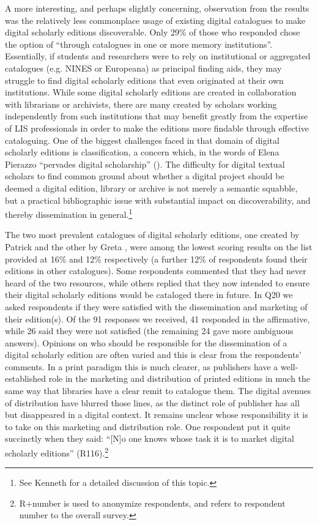 \begin{paper}
A more interesting, and perhaps slightly concerning, observation from
the results was the relatively less commonplace usage of existing
digital catalogues to make digital scholarly editions discoverable. Only
29\% of those who responded chose the option of ``through catalogues in
one or more memory institutions''. Essentially, if students and
researchers were to rely on institutional or aggregated catalogues (e.g.
NINES or Europeana) as principal finding aids, they may struggle to find
digital scholarly editions that even originated at their own
institutions. While some digital scholarly editions are created in
collaboration with librarians or archivists, there are many created by
scholars working independently from such institutions that may benefit
greatly from the expertise of LIS professionals in order to make the
editions more findable through effective cataloguing. One of the biggest
challenges faced in that domain of digital scholarly editions is
classification, a concern which, in the words of Elena Pierazzo
``pervades digital scholarship'' (\citeyear[6]{pierazzo_digital_2015}). The difficulty for digital
textual scholars to find common ground about whether a digital project should
be deemed a digital edition, library or archive is not merely a semantic
squabble, but a practical bibliographic issue with substantial impact on
discoverability, and thereby dissemination in general.\footnote{See Kenneth
  \citealt{price_edition_2009} for a detailed discussion of this topic.}

The two most prevalent catalogues of digital scholarly editions, one
created by Patrick \citet{sahle_what_2016} and the other by Greta \citet{franzini_catalogue_2016},
were among the lowest scoring results on the list provided at 16\% and
12\% respectively (a further 12\% of respondents found their editions in
other catalogues). Some respondents commented that they had never heard
of the two resources, while others replied that they now intended to
ensure their digital scholarly editions would be cataloged there in
future. In Q20 we asked respondents if they were satisfied with the
dissemination and marketing of their edition(s). Of the 91 responses we
received, 41 responded in the affirmative, while 26 said they were not
satisfied (the remaining 24 gave more ambiguous answers). Opinions on
who should be responsible for the dissemination of a digital scholarly
edition are often varied and this is clear from the respondents'
comments. In a print paradigm this is much clearer, as publishers have a
well-established role in the marketing and distribution of printed
editions in much the same way that libraries have a clear remit to
catalogue them. The digital avenues of distribution have blurred those
lines, as the distinct role of publisher has all but disappeared in a
digital context. It remains unclear whose responsibility it is to take
on this marketing and distribution role. One respondent put it quite
succinctly when they said: ``{[}N{]}o one knows whose task it is to
market digital scholarly editions'' (R116).\footnote{R+number is used to
  anonymize respondents, and refers to respondent number to the overall
  survey.}


\end{paper}
